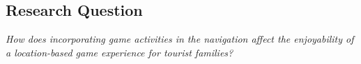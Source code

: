 \subsection{Research Question}
\emph{How does incorporating game activities in the navigation affect the enjoyability of a location-based game experience for tourist families?}